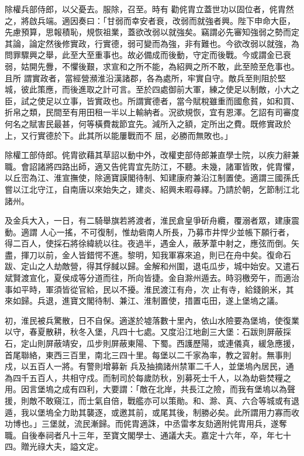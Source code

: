 \begin{pinyinscope}
 除權兵部侍郎，以父憂去。服除，召至。時有
 勸侂胄立蓋世功以固位者，侂胄然之，將啟兵端。適因奏曰：「甘弱而幸安者衰，改弱而就強者興。陛下申命大臣，先慮預算，思報積恥，規恢祖業，蓋欲改弱以就強矣。竊謂必先審知強弱之勢而定其論，論定然後修實政，行實德，弱可變而為強，非有難也。今欲改弱以就強，為問罪驟興之舉，此至大至重事也。故必備成而後動，守定而後戰。今或謂金已衰弱，姑開先釁，不懼後艱，求宣和之所不能，為紹興之所不敢，此至險至危事也。且所
 謂實政者，當經營瀕淮沿漢諸郡，各為處所，牢實自守。敵兵至則阻於堅城，彼此策應，而後進取之計可言。至於四處御前大軍，練之使足以制敵，小大之臣，試之使足以立事，皆實政也。所謂實德者，當今賦稅雖重而國愈貧，如和買、折帛之類，民間至有用田租一半以上輸納者。況欲規恢，宜有恩澤。乞詔有司審度何名之賦害民最甚，何等橫費裁節宜先。減所入之額，定所出之費。既修實政於上，又行實德於下。此其所以能屢戰而不
 屈，必勝而無敗也。」



 除權工部侍郎。侂胄欲藉其草詔以動中外，改權吏部侍郎兼直學士院，以疾力辭兼職。會詔諸將四路出師，適又告侂胄宜先防江，不聽。未幾，諸軍皆敗，侂胄懼，以丘崈為江、淮宣撫使，除適寶謨閣待制、知建康府兼沿江制置使。適謂三國孫氏嘗以江北守江，自南唐以來始失之，建炎、紹興未暇尋繹。乃請於朝，乞節制江北諸州。



 及金兵大入，一日，有二騎舉旗若將渡者，淮民倉皇爭斫舟纜，覆溺者眾，建康震動。適謂
 人心一搖，不可復制，惟劫砦南人所長，乃募市井悍少並帳下願行者，得二百人，使採石將徐緯統以往。夜過半，遇金人，蔽茅葦中射之，應弦而倒。矢盡，揮刀以前，金人皆錯愕不進。黎明，知我軍寡來追，則已在舟中矣。復命石跋、定山之人劫敵營，得其俘馘以歸。金解和州圍，退屯瓜步，城中始安。又遣石斌賢渡宣化，夏侯成等分道而往，所向皆捷。金自滁州遁去。時羽檄旁午，而適治事如平時，軍須皆從官給，民以不擾。淮民渡江有舟，次
 止有寺，給錢餉米，其來如歸。兵退，進寶文閣待制、兼江、淮制置使，措置屯田，遂上堡塢之議。



 初，淮民被兵驚散，日不自保。適遂於墟落數十里內，依山水險要為堡塢，使復業以守，春夏散耕，秋冬入堡，凡四十七處。又度沿江地創三大堡：石跋則屏蔽採石，定山則屏蔽靖安，瓜步則屏蔽東陽、下蜀。西護歷陽，或連儀真，緩急應援，首尾聯絡，東西三百里，南北三四十里。每堡以二千家為率，教之習射。無事則戍，以五百人一將。有警則增募新
 兵及抽摘諸州禁軍二千人，並堡塢內居民，通為四千五百人，共相守戍。而制司於每歲防秋，別募死士千人，以為劫砦焚糧之用。因言堡塢之成有四利，大要謂：「敵在北岸，共長江之險，而我有堡塢以為聲援，則敵不敢窺江，而士氣自倍，戰艦亦可以策勛。和、滁、真、六合等城或有退遁，我以堡塢全力助其襲逐，或邀其前，或尾其後，制勝必矣。此所謂用力寡而收功博也。」三堡就，流民漸歸。而侂胄適誅，中丞雷孝友劾適附侂胄用兵，遂奪
 職。自後奉祠者凡十三年，至寶文閣學士、通議大夫。嘉定十六年，卒，年七十四。贈光祿大夫，謚文定。




\end{pinyinscope}
